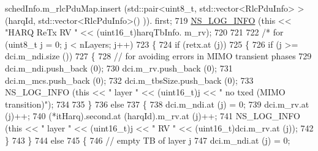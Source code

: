 \begin{DoxyCode}
{      schedInfo.m\_rlcPduMap.insert (std::pair<uint8\_t, std::vector<RlcPduInfo> > (harqId, std::vector<RlcPduInfo>() )).
      first;
719                                 \hyperlink{group__logging_gafbd73ee2cf9f26b319f49086d8e860fb}{NS\_LOG\_INFO} (\textcolor{keyword}{this} << \textcolor{stringliteral}{"HARQ ReTx RV "} << (uint16\_t)harqTbInfo.
      m\_rv);
720 
721 
722                                 \textcolor{comment}{/*                      for (uint8\_t j = 0; j < nLayers; j++)}
723 \textcolor{comment}{                        \{}
724 \textcolor{comment}{                                if (retx.at (j))}
725 \textcolor{comment}{                                \{}
726 \textcolor{comment}{                                        if (j >= dci.m\_ndi.size ())}
727 \textcolor{comment}{                                        \{}
728 \textcolor{comment}{                                                // for avoiding errors in MIMO transient phases}
729 \textcolor{comment}{                                                dci.m\_ndi.push\_back (0);}
730 \textcolor{comment}{                                                dci.m\_rv.push\_back (0);}
731 \textcolor{comment}{                                                dci.m\_mcs.push\_back (0);}
732 \textcolor{comment}{                                                dci.m\_tbsSize.push\_back (0);}
733 \textcolor{comment}{                                                NS\_LOG\_INFO (this << " layer " << (uint16\_t)j << " no txed
       (MIMO transition)");}
734 \textcolor{comment}{}
735 \textcolor{comment}{                                        \}}
736 \textcolor{comment}{                                        else}
737 \textcolor{comment}{                                        \{}
738 \textcolor{comment}{                                                dci.m\_ndi.at (j) = 0;}
739 \textcolor{comment}{                                                dci.m\_rv.at (j)++;}
740 \textcolor{comment}{                                                (*itHarq).second.at (harqId).m\_rv.at (j)++;}
741 \textcolor{comment}{                                                NS\_LOG\_INFO (this << " layer " << (uint16\_t)j << " RV " <<
       (uint16\_t)dci.m\_rv.at (j));}
742 \textcolor{comment}{                                        \}}
743 \textcolor{comment}{                                \}}
744 \textcolor{comment}{                                else}
745 \textcolor{comment}{                                \{}
746 \textcolor{comment}{                                        // empty TB of layer j}
747 \textcolor{comment}{                                        dci.m\_ndi.at (j) = 0;}
}
\end{DoxyCode}
